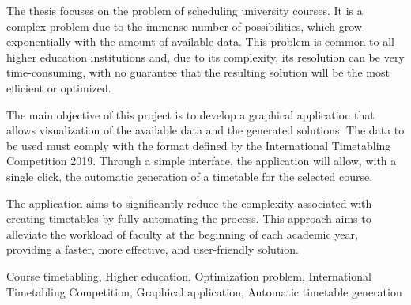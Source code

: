 
The thesis focuses on the problem of scheduling university courses. It is a complex problem due to the immense number of possibilities, which grow exponentially with the amount of available data. This problem is common to all higher education institutions and, due to its complexity, its resolution can be very time-consuming, with no guarantee that the resulting solution will be the most efficient or optimized.

The main objective of this project is to develop a graphical application that allows visualization of the available data and the generated solutions. The data to be used must comply with the format defined by the International Timetabling Competition 2019. Through a simple interface, the application will allow, with a single click, the automatic generation of a timetable for the selected course.

The application aims to significantly reduce the complexity associated with creating timetables by fully automating the process. This approach aims to alleviate the workload of faculty at the beginning of each academic year, providing a faster, more effective, and user-friendly solution.

\begin{keywords}
Course timetabling, Higher education, Optimization problem, International Timetabling Competition, Graphical application, Automatic timetable generation
\end{keywords} 
